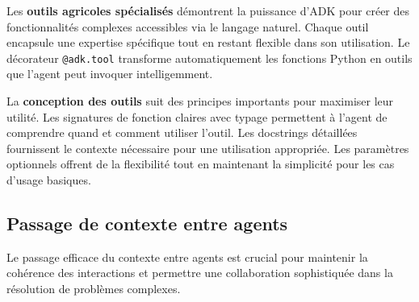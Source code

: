 Les \textbf{outils agricoles spécialisés} démontrent la puissance d'ADK pour créer des fonctionnalités complexes accessibles via le langage naturel. Chaque outil encapsule une expertise spécifique tout en restant flexible dans son utilisation. Le décorateur \texttt{@adk.tool} transforme automatiquement les fonctions Python en outils que l'agent peut invoquer intelligemment.

La \textbf{conception des outils} suit des principes importants pour maximiser leur utilité. Les signatures de fonction claires avec typage permettent à l'agent de comprendre quand et comment utiliser l'outil. Les docstrings détaillées fournissent le contexte nécessaire pour une utilisation appropriée. Les paramètres optionnels offrent de la flexibilité tout en maintenant la simplicité pour les cas d'usage basiques.

\subsection{Passage de contexte entre agents}

Le passage efficace du contexte entre agents est crucial pour maintenir la cohérence des interactions et permettre une collaboration sophistiquée dans la résolution de problèmes complexes.

